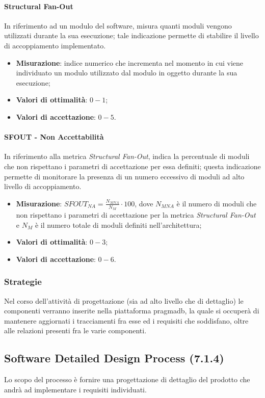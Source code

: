 \paragraph{Structural Fan-Out}
\label{SFOUT}
In riferimento ad un modulo del software, misura quanti moduli vengono utilizzati durante la sua esecuzione; tale indicazione permette di stabilire il livello di accoppiamento implementato.
\begin{itemize}
\item \textbf{Misurazione}: indice numerico che incrementa nel momento in cui viene individuato un modulo utilizzato dal modulo in oggetto durante la sua esecuzione;
\item \textbf{Valori di ottimalità}: $0 - 1$;
\item \textbf{Valori di accettazione}: $0 - 5$.
\end{itemize}
\paragraph{SFOUT - Non Accettabilità}
\label{sfout-NonAcc}
In riferimento alla metrica \textit{Structural Fan-Out}, indica la percentuale di moduli che non rispettano i parametri di accettazione per essa definiti; questa indicazione permette di monitorare la presenza di un numero eccessivo di moduli ad alto livello di accoppiamento.
\begin{itemize}
\item \textbf{Misurazione}: $SFOUT_{NA}=\frac{N_{MNA}}{N_{M}} \cdot 100$, dove $N_{MNA}$ è il numero di moduli che non rispettano i parametri di accettazione per la metrica \textit{Structural Fan-Out} e $N_{M}$ è il numero totale di moduli definiti nell'architettura;
\item \textbf{Valori di ottimalità}: $0 - 3$;
\item \textbf{Valori di accettazione}: $0 - 6$.
\end{itemize}
\subsubsection{Strategie}
Nel corso dell'attività di progettazione (sia ad alto livello che di dettaglio) le componenti verranno inserite nella piattaforma pragmadb, la quale si occuperà di mantenere aggiornati i tracciamenti fra esse ed i requisiti che soddisfano, oltre alle relazioni presenti fra le varie componenti.
\subsection{Software Detailed Design Process (7.1.4)}
\label{sySoDetailDesign}
Lo scopo del processo è fornire una progettazione di dettaglio del prodotto che andrà ad implementare i requisiti individuati.

